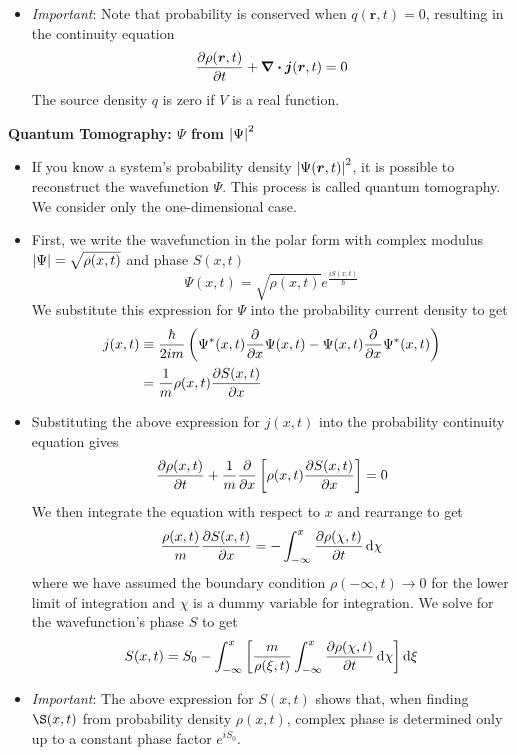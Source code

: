 \documentclass[11pt, a4paper]{article}
\newcommand{\diff}{\mathop{}\!\mathrm{d}} %
\renewcommand{\vec}[1]{\bm{#1}} %
\renewcommand{\r}{\vec{r}}  %
\renewcommand{\P}{\Psi}  %
\begin{document}
\begin{itemize}
	\item \textit{Important}: Note that probability is conserved when $ q(\r, t) = 0$, resulting in the continuity equation
	\begin{equation*}
		\pdv{\rho(\r, t)}{t} + \div \vec{j}(\r, t) = 0
	\end{equation*}
	The source density $ q $ is zero if $ V $ is a real function.
	
\end{itemize}
\textbf{Quantum Tomography: $ \P $ from $ \abs{\P}^{2} $}
\begin{itemize}
	\item If you know a system's probability density $\abs{\P(\r, t)}^{2} $, it is possible to reconstruct the wavefunction $ \P $. This process is called quantum tomography. We consider only the one-dimensional case. 
	
	\item First, we write the wavefunction in the polar form with complex modulus $ \abs{\P} = \sqrt{\rho(x, t)} $ and phase $ S(x, t) $
	\begin{equation*}
		\P(x, t) = \sqrt{\rho(x, t)}e^{\frac{iS(x, t)}{\hbar}}
	\end{equation*}
	We substitute this expression for $ \P $ into the probability current density to get
	\begin{align*}
		j(x, t) &\equiv \frac{\hbar}{2im}\left(\P^{*}(x, t)\pdv{x}\P(x, t) - \P(x, t)\pdv{x}\P^{*}(x, t)\right) \\
		& = \frac{1}{m} \rho(x, t)\pdv{S(x, t)}{x}
	\end{align*}
	
	\item Substituting the above expression for $ j(x, t) $ into the probability continuity equation gives
	\begin{equation*}
		\pdv{\rho(x, t)}{t} + \frac{1}{m}\pdv{x}\left[\rho(x, t) \pdv{S(x, t)}{x}\right] = 0
	\end{equation*}
	We then integrate the equation with respect to $ x $ and rearrange to get
	\begin{equation*}
		\frac{\rho(x, t)}{m} \pdv{S(x, t)}{x} = - \int_{-\infty}^{x} \pdv{\rho(\chi, t)}{t}\diff \chi
	\end{equation*}
	where we have assumed the boundary condition $ \rho(-\infty, t) \to 0 $ for the lower limit of integration and $ \chi $ is a dummy variable for integration. We solve for the wavefunction's phase $ S $ to get
	\begin{equation*}
		S(x, t) = S_{0} - \int_{-\infty}^{x} \left[ \frac{m}{\rho(\xi, t)} \int_{-\infty}^{x} \pdv{\rho(\chi, t)}{t}\diff \chi\right] \diff \xi
	\end{equation*}
	
	\item \textit{Important}: The above expression for $ S(x, t) $ shows that, when finding $ \S(x, t) $ from probability density $ \rho(x, t) $, complex phase is determined only up to a constant phase factor $ e^{iS_{0}} $.
\end{itemize}
\end{document}
